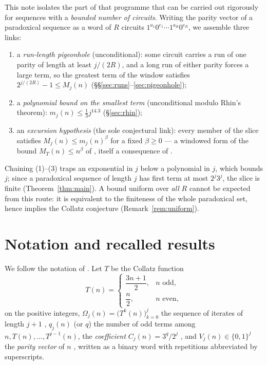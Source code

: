 \documentclass[11pt]{amsart}
\theoremstyle{plain}
\theoremstyle{definition}
\theoremstyle{remark}
\begin{document}
This note isolates the part of that programme that can be carried out
rigorously for sequences with a \emph{bounded number of circuits}.  Writing
the parity vector of a paradoxical sequence as a word of $R$ circuits
$1^{a_1}0^{e_1}\cdots 1^{a_R}0^{e_R}$, we assemble three links:
\begin{enumerate}
\item[(1)] a \emph{run-length pigeonhole} (unconditional): some circuit
carries a run of one parity of length at least $j/(2R)$, and a long run of
either parity forces a large term, so the greatest term of the window
satisfies $2^{j/(2R)}-1\le M_j(n)$ (\S\S\ref{sec:runs}--\ref{sec:pigeonhole});
\item[(2)] a \emph{polynomial bound on the smallest term} (unconditional
modulo Rhin's theorem): $m_j(n)\le\tfrac13 j^{14.3}$
(\S\ref{sec:rhin});
\item[(3)] an \emph{excursion hypothesis} (the sole conjectural link): every
member of the slice satisfies $M_j(n)\le m_j(n)^{\beta}$ for a fixed
$\beta\ge 0$ --- a windowed form of the bound $M_T(n)\le n^{\beta}$ of
\cite[eq.~(16)]{Roz25}, itself a consequence of \cite[Conj.~6.2]{Roz25}.
\end{enumerate}
Chaining (1)--(3) traps an exponential in $j$ below a polynomial in $j$,
which bounds $j$; since a paradoxical sequence of length $j$ has first term
at most $2^j 3^j$, the slice is finite (Theorem~\ref{thm:main}).  A bound
uniform over \emph{all} $R$ cannot be expected from this route: it is
equivalent to the finiteness of the whole paradoxical set, hence implies the
Collatz conjecture (Remark~\ref{rem:uniform}).

\section{Notation and recalled results}\label{sec:background}

We follow the notation of \cite{Roz25}.  Let $T$ be the Collatz function
\[
T(n)=
\begin{cases}
\dfrac{3n+1}{2}, & n \text{ odd},\\[1ex]
\dfrac{n}{2}, & n \text{ even},
\end{cases}
\]
on the positive integers, $\Omega_j(n)=\bigl(T^k(n)\bigr)_{k=0}^{j}$ the
sequence of iterates of length $j+1$ \cite[Def.~4.1]{Roz25}, $q_j(n)$ (or
$q$) the number of odd terms among $n,T(n),\dots,T^{j-1}(n)$, the
\emph{coefficient} $C_j(n)=3^{q}/2^{j}$ \cite[eq.~(2)]{Roz25}, and
$V_j(n)\in\{0,1\}^j$ the \emph{parity vector} of $n$
\cite[Def.~2.1]{Roz25}, written as a binary word with repetitions
abbreviated by superscripts.
\end{document}
